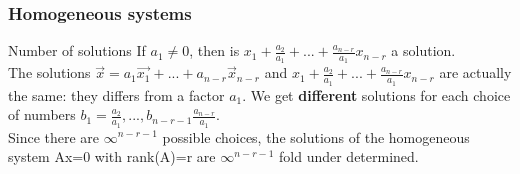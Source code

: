 \begin{frame}
	\frametitle{Homogeneous systems}
	\begin{block}{Number of solutions}
		If $a_1\neq0$, then is $x_1+\frac{a_2}{a_1}+...+\frac{a_{n-r}}{a_1}x_{n-r}$ a solution.\\
		The solutions $\overrightarrow{x}=a_1\overrightarrow{x_1}+...+a_{n-r}\overrightarrow{x}_{n-r}$ and $x_1+\frac{a_2}{a_1}+...+\frac{a_{n-r}}{a_1}x_{n-r}$ are actually the same: they differs from a factor $a_1$. 
		We get \textbf{different} solutions for each choice of numbers $b_1=\frac{a_2}{a_1},...,b_{n-r-1}\frac{a_{n-r}}{a_1}$. \\
		\vspace{4mm}
		Since there are $\infty^{n-r-1}$ possible choices, the solutions of the homogeneous system Ax=0 with rank(A)=r are $\infty^{n-r-1}$ fold under determined.
	\end{block}
\end{frame}

